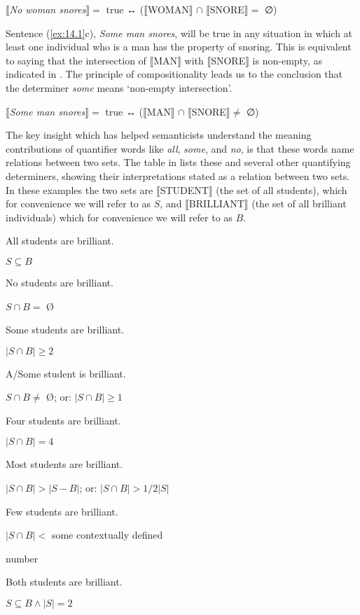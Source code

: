 \ea \label{ex:14.3}
{}$\llbracket$\textit{No woman snores}$\rrbracket =$ true ↔  ($\llbracket$WOMAN$\rrbracket$  ${\cap}$ $\llbracket$SNORE$\rrbracket =$ ∅)
\z


Sentence (\ref{ex:14.1}c), \textit{Some man snores}, will be true in any situation in which at least one individual who is a man has the property of snoring. This is equivalent to saying that the intersection of $\llbracket$MAN$\rrbracket$  with $\llbracket$SNORE$\rrbracket$  is non-empty, as indicated in . The principle of compositionality leads us to the conclusion that the determiner \textit{some} means ‘non-empty intersection’.


\ea \label{ex:14.4}
{}$\llbracket$\textit{Some man snores}$\rrbracket =$ true ↔  ($\llbracket$MAN$\rrbracket$  ${\cap}$ $\llbracket$SNORE$\rrbracket \neq$ ∅)
\z


The key insight which has helped semanticists understand the meaning contributions of quantifier words like \textit{all}, \textit{some}, and \textit{no}, is that these words name relations between two sets. The table in  lists these and several other quantifying determiners, showing their interpretations stated as a relation between two sets. In these examples the two sets are $\llbracket$STUDENT$\rrbracket$  (the set of all students), which for convenience we will refer to as $S$, and $\llbracket$BRILLIANT$\rrbracket$  (the set of all brilliant individuals) which for convenience we will refer to as $B$.

\ea \label{ex:14.5}
\ea \parbox{4.5cm}{All students are brilliant.}\parbox{6cm}{$S \subseteq B$}
\ex \parbox{4.5cm}{No students are brilliant.}\parbox{6cm}{$S  \cap {B} =$ Ø}
\ex \parbox{4.5cm}{Some students are brilliant.}\parbox{6cm}{$|S \cap B| \geq 2$}
\ex \parbox{4.5cm}{A/Some student is brilliant.}\parbox{6cm}{$S  \cap B \neq$ Ø; or:  $|S \cap B| \geq 1$}
\ex \parbox{4.5cm}{Four students are brilliant.}\parbox{6cm}{$|S \cap B | = 4$\footnotemark{}}
\ex \parbox{4.5cm}{Most students are brilliant.}\parbox{6cm}{$|S \cap B | > |S - B|$; or: $|S \cap B| > 1/2|S|$}
\ex \parbox{4.5cm}{Few students are brilliant.}\parbox[t]{5.7cm}{$|S \cap B | <$ some contextually defined\\\rule{0pt}{0pt}\hfill number}
\ex \parbox{4.5cm}{Both students are brilliant.}\parbox{6cm}{$S  \subseteq B  \wedge |S| = 2$}\label{ex:14.5h}
\z \z
{}

